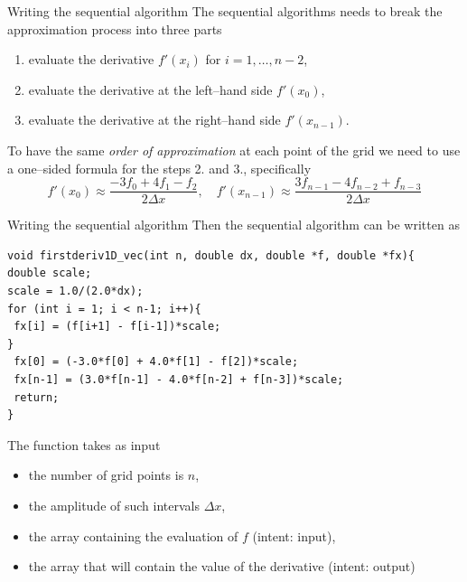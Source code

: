 \documentclass[xcolor={svgnames,usenames}]{beamer}
\begin{document}
\begin{frame}{Writing the sequential algorithm}
The sequential algorithms needs to break the approximation process into
three parts
\begin{enumerate}
	\item evaluate the derivative $f'(x_i)$ for $i=1,\ldots,n-2$,
	\item evaluate the derivative at the left--hand side $f'(x_0)$,
	\item evaluate the derivative at the right--hand side $f'(x_{n-1})$.
\end{enumerate}
To have the same \emph{order of approximation} at each point of the grid we need to use a one--sided formula for the steps \alert{2.} and \alert{3.}, specifically
\begin{equation*}
	f'(x_0) \approx \frac{-3 f_0 + 4 f_1 - f_2}{2 \Delta x}, \quad f'(x_{n-1}) \approx \frac{3f_{n-1} -4 f_{n-2} + f_{n-3}}{2 \Delta x}
\end{equation*}
\end{frame}

\begin{frame}[fragile]{Writing the sequential algorithm}
\small
Then the sequential algorithm can be written as
\begin{verbatim}
void firstderiv1D_vec(int n, double dx, double *f, double *fx){
double scale;
scale = 1.0/(2.0*dx);
for (int i = 1; i < n-1; i++){
 fx[i] = (f[i+1] - f[i-1])*scale;
}
 fx[0] = (-3.0*f[0] + 4.0*f[1] - f[2])*scale;
 fx[n-1] = (3.0*f[n-1] - 4.0*f[n-2] + f[n-3])*scale;
 return;
}
\end{verbatim}
The function takes as input
\begin{itemize}
	\item the number of grid points is $n$,
	\item the amplitude of such intervals $\Delta x$,
	\item the array containing the evaluation of $f$ (intent: input),
	\item the array that will contain the value of the derivative (intent: output)
\end{itemize}
\end{frame}
\end{document}
